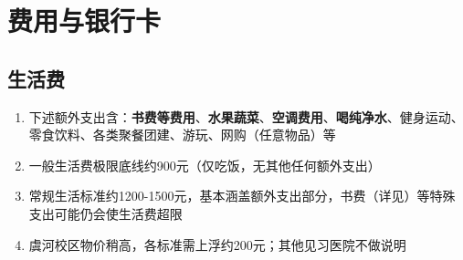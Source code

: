 \section[费用与银行卡]{费用与银行卡}

\subsection[生活费]{生活费}
\begin{enumerate}
    \item 下述额外支出含：\textbf{书费等费用}、\textbf{水果蔬菜}、\textbf{空调费用}、\textbf{喝纯净水}、健身运动、零食饮料、各类聚餐团建、游玩、网购（任意物品）等
    \item 一般生活费极限底线约900元（仅吃饭，无其他任何额外支出\footnotemark）
    \item 常规生活标准约1200-1500元，基本涵盖额外支出部分，书费（详见）等特殊支出可能仍会使生活费超限
    \item 虞河校区物价稍高，各标准需上浮约200元；其他见习医院不做说明
\end{enumerate}

